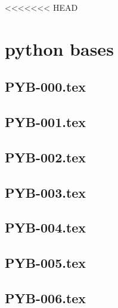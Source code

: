 <<<<<<< HEAD
\section*{python bases}
\newcommand{\xxexo}{PYB-000.tex} 
\subsection*{\xxexo} 
\graphicspath{{../../exos/python_bases/PYB-000/}}
 
 
\renewcommand{\xxexo}{PYB-001.tex} 
\subsection*{\xxexo} 
\graphicspath{{../../exos/python_bases/PYB-001/}}
 
 
\renewcommand{\xxexo}{PYB-002.tex} 
\subsection*{\xxexo} 
\graphicspath{{../../exos/python_bases/PYB-002/}}
 
 
\renewcommand{\xxexo}{PYB-003.tex} 
\subsection*{\xxexo} 
\graphicspath{{../../exos/python_bases/PYB-003/}}
 
 
\renewcommand{\xxexo}{PYB-004.tex} 
\subsection*{\xxexo} 
\graphicspath{{../../exos/python_bases/PYB-004/}}
 
 
\renewcommand{\xxexo}{PYB-005.tex} 
\subsection*{\xxexo} 
\graphicspath{{../../exos/python_bases/PYB-005/}}
 
 
\renewcommand{\xxexo}{PYB-006.tex} 
\subsection*{\xxexo} 
\graphicspath{{../../exos/python_bases/PYB-006/}}
 
 
